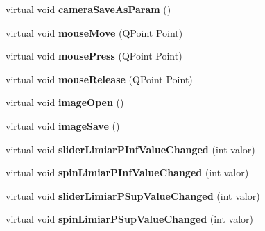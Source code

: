 \begin{DoxyCompactItemize}
\item 
virtual void {\bfseries camera\+Save\+As\+Param} ()\hypertarget{classcalibrador_af9948575e575f168cbaab910c65df7b1}{}\label{classcalibrador_af9948575e575f168cbaab910c65df7b1}

\item 
virtual void {\bfseries mouse\+Move} (Q\+Point Point)\hypertarget{classcalibrador_a1ba88d516e3e939871ec96c6e79564d3}{}\label{classcalibrador_a1ba88d516e3e939871ec96c6e79564d3}

\item 
virtual void {\bfseries mouse\+Press} (Q\+Point Point)\hypertarget{classcalibrador_a142c5418a9490176f9f33e69c04995a4}{}\label{classcalibrador_a142c5418a9490176f9f33e69c04995a4}

\item 
virtual void {\bfseries mouse\+Release} (Q\+Point Point)\hypertarget{classcalibrador_a5943e1411169276dab7c645270092e74}{}\label{classcalibrador_a5943e1411169276dab7c645270092e74}

\item 
virtual void {\bfseries image\+Open} ()\hypertarget{classcalibrador_a4195ffbcb42a2eb1ad6a839456e63916}{}\label{classcalibrador_a4195ffbcb42a2eb1ad6a839456e63916}

\item 
virtual void {\bfseries image\+Save} ()\hypertarget{classcalibrador_aab7584bc457d0c8209680f6db5281480}{}\label{classcalibrador_aab7584bc457d0c8209680f6db5281480}

\item 
virtual void {\bfseries slider\+Limiar\+P\+Inf\+Value\+Changed} (int valor)\hypertarget{classcalibrador_a6c2bfdca83694b058e721f986ef41b56}{}\label{classcalibrador_a6c2bfdca83694b058e721f986ef41b56}

\item 
virtual void {\bfseries spin\+Limiar\+P\+Inf\+Value\+Changed} (int valor)\hypertarget{classcalibrador_a2c91d7d2357a2d3c8d28f6e4e8df89cc}{}\label{classcalibrador_a2c91d7d2357a2d3c8d28f6e4e8df89cc}

\item 
virtual void {\bfseries slider\+Limiar\+P\+Sup\+Value\+Changed} (int valor)\hypertarget{classcalibrador_a9c3f8992368c703296282cac312afad1}{}\label{classcalibrador_a9c3f8992368c703296282cac312afad1}

\item 
virtual void {\bfseries spin\+Limiar\+P\+Sup\+Value\+Changed} (int valor)\hypertarget{classcalibrador_af2e94fabe0a06c7e477cc086ae329a33}{}\label{classcalibrador_af2e94fabe0a06c7e477cc086ae329a33}


\end{DoxyCompactItemize}

